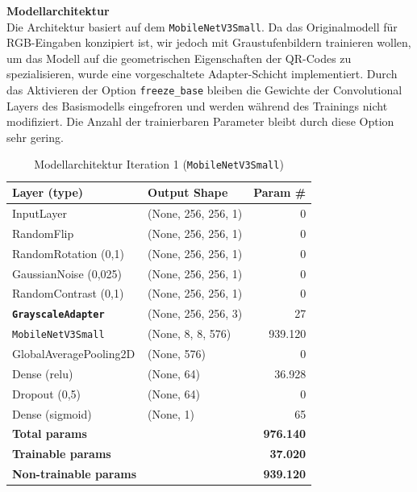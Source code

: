 \documentclass[
    a4paper,        %
    11pt,           %
    ngerman,        %
    parskip=half,   %
    listof=totoc,   %
    bibliography=totoc %
]{scrartcl}
\begin{document}
\textbf{Modellarchitektur} \\
Die Architektur basiert auf dem \texttt{MobileNetV3Small}. Da das Originalmodell für RGB-Eingaben konzipiert ist, wir jedoch mit Graustufenbildern trainieren wollen, um das Modell auf die geometrischen Eigenschaften der QR-Codes zu spezialisieren, wurde eine vorgeschaltete Adapter-Schicht implementiert. Durch das Aktivieren der Option \texttt{freeze\_base} bleiben die Gewichte der Convolutional Layers des Basismodells eingefroren und werden während des Trainings nicht modifiziert. Die Anzahl der trainierbaren Parameter bleibt durch diese Option sehr gering.

\begin{table}[H]
    \centering
    \caption{Modellarchitektur Iteration 1 (\texttt{MobileNetV3Small})}
    \label{tab:mnetv3s_model_summary_iter1}
    \begin{tabular}{llr}
        \toprule
        \textbf{Layer (type)} & \textbf{Output Shape} & \textbf{Param \#} \\
        \midrule
        InputLayer & (None, 256, 256, 1) & 0 \\
        RandomFlip & (None, 256, 256, 1) & 0 \\
        RandomRotation (0,1) & (None, 256, 256, 1) & 0 \\
        GaussianNoise (0,025) & (None, 256, 256, 1) & 0 \\
        RandomContrast (0,1) & (None, 256, 256, 1) & 0 \\
        \textbf{\texttt{GrayscaleAdapter}} & (None, 256, 256, 3) & 27 \\
        \texttt{MobileNetV3Small} & (None, 8, 8, 576) & 939.120 \\
        GlobalAveragePooling2D & (None, 576) & 0 \\
        Dense (relu) & (None, 64) & 36.928 \\
        Dropout (0,5) & (None, 64) & 0 \\
        Dense (sigmoid) & (None, 1) & 65 \\
        \midrule
        \textbf{Total params} & & \textbf{976.140} \\
        \textbf{Trainable params} & & \textbf{37.020} \\
        \textbf{Non-trainable params} & & \textbf{939.120} \\
        \bottomrule
    \end{tabular}
\end{table}
\end{document}
